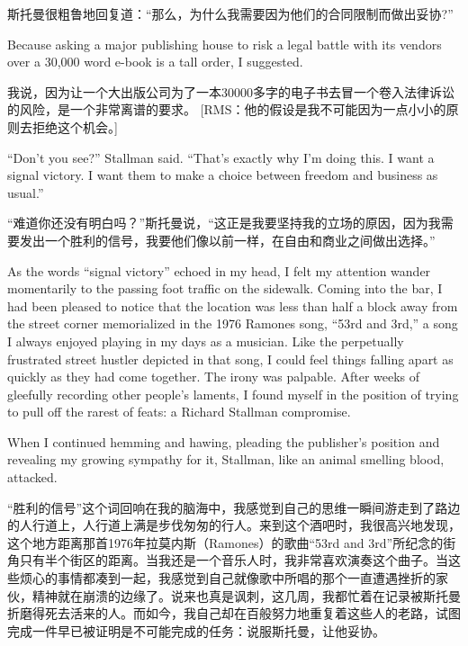 \ifdefined\chs
斯托曼很粗鲁地回复道：``那么，为什么我需要因为他们的合同限制而做出妥协?''
\fi

\ifdefined\eng
Because asking a major publishing house to risk a legal battle with its vendors over a 30,000 word e-book is a tall order, I suggested.
\ifdefined{}
\fi
\fi

\ifdefined\chs
我说，因为让一个大出版公司为了一本30000多字的电子书去冒一个卷入法律诉讼的风险，是一个非常离谱的要求。
\ifdefined\vtwo
[RMS：他的假设是我不可能因为一点小小的原则去拒绝这个机会。]
\fi
\fi

\ifdefined\eng
``Don't you see?'' Stallman said. ``That's exactly why I'm doing this. I want a signal victory. I want them to make a choice between freedom and business as usual.''
\fi

\ifdefined\chs
``难道你还没有明白吗？''斯托曼说，``这正是我要坚持我的立场的原因，因为我需要发出一个胜利的信号，我要他们像以前一样，在自由和商业之间做出选择。''
\fi

\ifdefined\eng
As the words ``signal victory'' echoed in my head, I felt my attention wander momentarily to the passing foot traffic on the sidewalk. Coming into the bar, I had been pleased to notice that the location was less than half a block away from the street corner memorialized in the 1976 Ramones song, ``53rd and 3rd,'' a song I always enjoyed playing in my days as a musician. Like the perpetually frustrated street hustler depicted in that song, I could feel things falling apart as quickly as they had come together. The irony was palpable. After weeks of gleefully recording other people's laments, I found myself in the position of trying to pull off the rarest of feats: a Richard Stallman compromise. 

When I continued hemming and hawing, pleading the publisher's position and revealing my growing sympathy for it, Stallman, like an animal smelling blood, attacked. 
\fi

\ifdefined\chs
``胜利的信号''这个词回响在我的脑海中，我感觉到自己的思维一瞬间游走到了路边的人行道上，人行道上满是步伐匆匆的行人。来到这个酒吧时，我很高兴地发现，这个地方距离那首1976年拉莫内斯（Ramones）的歌曲``53rd and 3rd''所纪念的街角只有半个街区的距离。当我还是一个音乐人时，我非常喜欢演奏这个曲子。当这些烦心的事情都凑到一起，我感觉到自己就像歌中所唱的那个一直遭遇挫折的家伙，精神就在崩溃的边缘了。说来也真是讽刺，这几周，我都忙着在记录被斯托曼折磨得死去活来的人。而如今，我自己却在百般努力地重复着这些人的老路，试图完成一件早已被证明是不可能完成的任务：说服斯托曼，让他妥协。

